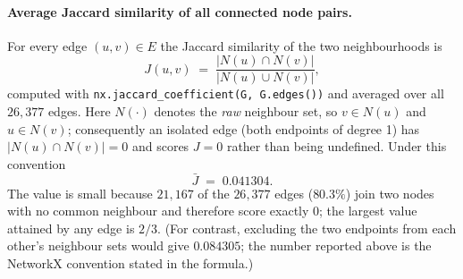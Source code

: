 \paragraph{Average Jaccard similarity of all connected node pairs.}
For every edge $(u,v)\in E$ the Jaccard similarity of the two neighbourhoods is
\[
  J(u,v) \;=\; \frac{\lvert N(u)\cap N(v)\rvert}{\lvert N(u)\cup N(v)\rvert},
\]
computed with \texttt{nx.jaccard\_coefficient(G, G.edges())} and averaged over all
$26{,}377$ edges. Here $N(\cdot)$ denotes the \emph{raw} neighbour set, so
$v\in N(u)$ and $u\in N(v)$; consequently an isolated edge (both endpoints of
degree 1) has $\lvert N(u)\cap N(v)\rvert=0$ and scores $J=0$ rather than being
undefined. Under this convention
\[
  \bar{J} \;=\; 0.041304 .
\]
The value is small because $21{,}167$ of the $26{,}377$ edges ($80.3\%$) join two
nodes with no common neighbour and therefore score exactly $0$; the largest value
attained by any edge is $2/3$. (For contrast, excluding the two endpoints from each
other's neighbour sets would give $0.084305$; the number reported above is the
NetworkX convention stated in the formula.)
